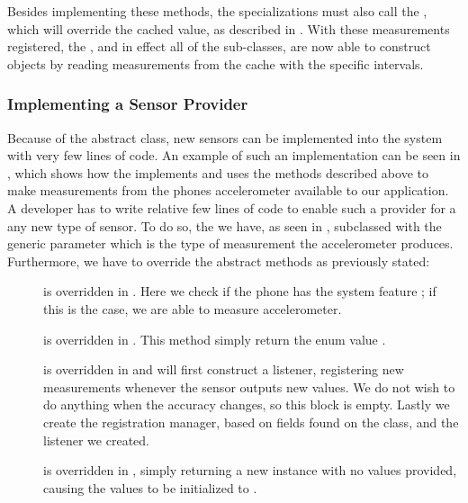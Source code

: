 Besides implementing these methods, the specializations must also call the , which will override the cached value, as described in . With these measurements registered, the , and in effect all of the sub-classes, are now able to construct  objects by reading measurements from the cache with the specific intervals. 

\subsubsection{Implementing a Sensor Provider}
Because of the abstract  class, new sensors can be implemented into the system with very few lines of code. An example of such an implementation can be seen in , which shows how the  implements and uses the methods described above to make measurements from the phones accelerometer available to our application. A developer has to write relative few lines of code to enable such a provider for a any new type of sensor. To do so, the we have, as seen in , subclassed  with the generic parameter  which is the type of measurement the accelerometer produces. Furthermore, we have to override the abstract methods as previously stated: 

\begin{description}
  \item[] is overridden in . Here we check if the phone has the system feature ; if this is the case, we are able to measure accelerometer.

  \item[] is overridden in . This method simply return the enum value .

  \item[] is overridden in  and will first construct a listener, registering new measurements whenever the sensor outputs new values. We do not wish to do anything when the accuracy changes, so this block is empty. Lastly we create the registration manager, based on fields found on the  class, and the listener we created.

  \item[] is overridden in , simply returning a new  instance with no values provided, causing the values to be initialized to .
\end{description}

